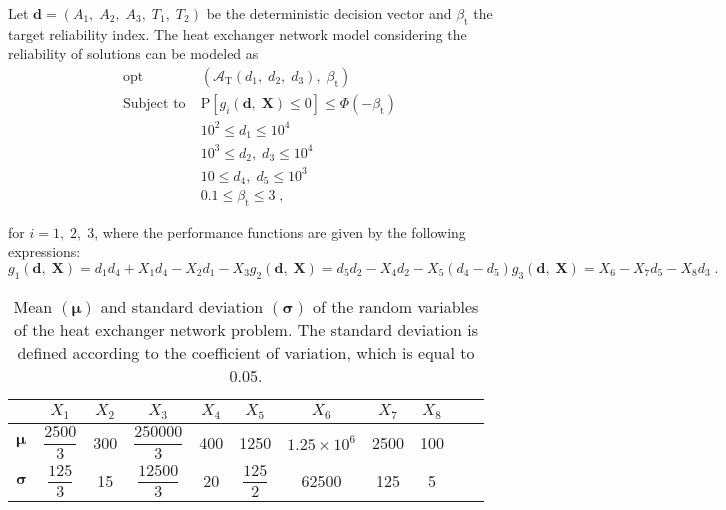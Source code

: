 \documentclass[final,5p,times,twocolumn,numbers]{elsarticle}
\newcommand{\vect}[1]{\mathbf{\boldsymbol{#1}}}
\DeclareMathOperator*{\opt}{opt}
\begin{document}
Let $ \mathbf{d} = \left( A_{1}, \; A_{2}, \; A_{3}, \; T_{1}, \; T_{2} \right) $ be the deterministic decision vector and $ \beta_{\mathrm{t}} $ the target reliability index. The heat exchanger network model considering the reliability of solutions can be modeled as
%
\begin{equation*}
\begin{split}
\opt \; &\left( \mathcal{A}_{\mathrm{T}} \left( d_{1}, \; d_{2}, \; d_{3} \right), \; \beta_{\mathrm{t}} \right)\\
\textrm{Subject to} \; &\mathrm{P} \left[ g_{i} \left( \mathbf{d}, \; \mathbf{X} \right) \leq 0 \right] \leq \Phi \left( -\beta_{\mathrm{t}} \right)\\
\phantom{Subject to} \; &10^{2} \leq d_{1} \leq 10^{4}\\
\phantom{Subject to} \; &10^{3} \leq d_{2}, \; d_{3} \leq 10^{4}\\
\phantom{Subject to} \; &10 \leq d_{4}, \; d_{5} \leq 10^{3}\\
\phantom{Subject to} \; &0.1 \leq \beta_{\mathrm{t}} \leq 3 \; ,
\end{split}
\end{equation*}

\noindent for $ i = 1, \; 2, \; 3 $, where the performance functions are given by the following expressions:
%
\begin{subequations}
\begin{equation*}
g_{1} \left( \mathbf{d}, \; \mathbf{X} \right) =  d_{1} d_{4} + X_{1} d_{4} - X_{2} d_{1} - X_{3}
\end{equation*}
%
\begin{equation*}
g_{2} \left( \mathbf{d}, \; \mathbf{X} \right) = d_{5} d_{2} - X_{4} d_{2} - X_{5} \left( d_{4} - d_{5} \right)
\end{equation*}
%
\begin{equation*}
g_{3} \left( \mathbf{d}, \; \mathbf{X} \right) = X_{6} - X_{7} d_{5} - X_{8} d_{3} \; .
\end{equation*}
\end{subequations}

\begin{table}[!ht]
\centering
\caption{Mean $ \left( \vect{\mu} \right) $ and standard deviation $ \left( \vect{\sigma} \right) $ of the random variables of the heat exchanger network problem. The standard deviation is defined according to the coefficient of variation, which is equal to 0.05.}
\label{tab:prop_estat_rede_trocadores_calor}
{\setlength{\tabulinesep}{1.4mm}
\setlength{\tabcolsep}{3pt}
\begin{tabu}{lcccccccccc}
\hline\hline
& $ X_{1} $ & $ X_{2} $ & $ X_{3} $ & $ X_{4} $ & $ X_{5} $ & $ X_{6} $ & $ X_{7} $ & $ X_{8} $ \\ \hline
$ \vect{\mu} $ & $ \dfrac{2500}{3} $ & 300 & $ \dfrac{250000}{3} $ & 400 & 1250 & $ 1.25 \times 10^{6} $ & 2500 & 100 \\
$ \vect{\sigma} $ & $ \dfrac{125}{3} $ & 15 & $ \dfrac{12500}{3} $ & 20 & $ \dfrac{125}{2} $ & 62500 & 125 & 5 \\ \hline\hline
\end{tabu}}
\end{table}
\end{document}
